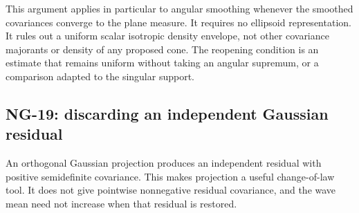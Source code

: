 This argument applies in particular to angular smoothing whenever the
smoothed covariances converge to the plane measure. It requires no
ellipsoid representation. It rules out a uniform scalar isotropic density
envelope, not other covariance majorants or density of any proposed cone.
The reopening condition is an estimate that remains uniform without taking
an angular supremum, or a comparison adapted to the singular support.

\subsection{NG-19: discarding an independent Gaussian residual}
\label{S:nogo-19}

An orthogonal Gaussian projection produces an independent residual with
positive semidefinite covariance. This makes projection a useful change-of-law
tool. It does not give pointwise nonnegative residual covariance, and the
wave mean need not increase when that residual is restored.

